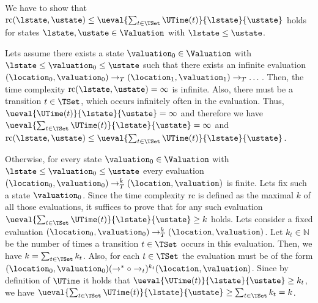 We have to show that $\text{rc}(\lstate, \ustate) \leq \ueval{\sum_{t \in \TSet}\UTime(t)}{\lstate}{\ustate}$ holds for states $\lstate, \ustate \in \Valuation$ with $\lstate \leq \ustate$.

Lets assume there exists a state $\valuation_0 \in \Valuation$ with $\lstate \leq \valuation_0 \leq \ustate$ such that there exists an infinite evaluation $(\location_0, \valuation_0) \rightarrow_T (\location_1, \valuation_1) \rightarrow_T \dots$.
Then, the time complexity $\text{rc}(\lstate, \ustate) = \infty$ is infinite.
Also, there must be a transition $t \in \TSet$, which occurs infinitely often in the evaluation.
Thus, $\ueval{\UTime(t)}{\lstate}{\ustate} = \infty$ and therefore we have $\ueval{\sum_{t \in \TSet}\UTime(t)}{\lstate}{\ustate} = \infty$ and $\text{rc}(\lstate, \ustate) \leq \ueval{\sum_{t \in \TSet}\UTime(t)}{\lstate}{\ustate}$.

Otherwise, for every state $\valuation_0 \in \Valuation$ with $\lstate \leq \valuation_0 \leq \ustate$ every evaluation $(\location_0, \valuation_0) \rightarrow^k_T (\location, \valuation)$ is finite.
Lets fix such a state $\valuation_0$.
Since the time complexity $\text{rc}$ is defined as the maximal $k$ of all those evaluations, it suffices to prove that for any such evaluation $\ueval{\sum_{t \in \TSet}\UTime(t)}{\lstate}{\ustate} \geq k$ holds.
Lets consider a fixed evaluation $(\location_0, \valuation_0) \rightarrow^k_T (\location, \valuation)$.
Let $k_t \in \mathbb{N}$ be the number of times a transition $t \in \TSet$ occurs in this evaluation.
Then, we have $k = \sum_{t \in \TSet} k_t$.
Also, for each $t \in \TSet$ the evaluation must be of the form $(\location_0, \valuation_0) (\rightarrow^* \circ \rightarrow_t)^{k_t} (\location, \valuation)$.
Since by definition of $\UTime$ it holds that $\ueval{\UTime(t)}{\lstate}{\ustate} \geq k_t$, we have $\ueval{\sum_{t \in \TSet}\UTime(t)}{\lstate}{\ustate} \geq \sum_{t \in \TSet} k_t = k$.
